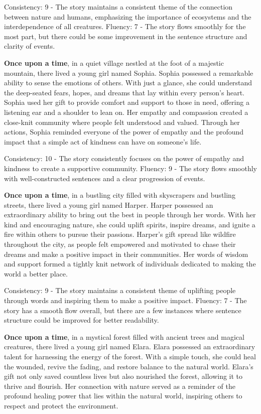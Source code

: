 \documentclass{article}
\begin{document}
Consistency: 9 - The story maintains a consistent theme of the connection between nature and humans, emphasizing the importance of ecosystems and the interdependence of all creatures.
Fluency: 7 - The story flows smoothly for the most part, but there could be some improvement in the sentence structure and clarity of events.

\textbf{Once upon a time}, in a quiet village nestled at the foot of a majestic mountain, there lived a young girl named Sophia. Sophia possessed a remarkable ability to sense the emotions of others. With just a glance, she could understand the deep-seated fears, hopes, and dreams that lay within every person's heart. Sophia used her gift to provide comfort and support to those in need, offering a listening ear and a shoulder to lean on. Her empathy and compassion created a close-knit community where people felt understood and valued. Through her actions, Sophia reminded everyone of the power of empathy and the profound impact that a simple act of kindness can have on someone's life.

Consistency: 10 - The story consistently focuses on the power of empathy and kindness to create a supportive community.
Fluency: 9 - The story flows smoothly with well-constructed sentences and a clear progression of events.

\textbf{Once upon a time}, in a bustling city filled with skyscrapers and bustling streets, there lived a young girl named Harper. Harper possessed an extraordinary ability to bring out the best in people through her words. With her kind and encouraging nature, she could uplift spirits, inspire dreams, and ignite a fire within others to pursue their passions. Harper's gift spread like wildfire throughout the city, as people felt empowered and motivated to chase their dreams and make a positive impact in their communities. Her words of wisdom and support formed a tightly knit network of individuals dedicated to making the world a better place.

Consistency: 9 - The story maintains a consistent theme of uplifting people through words and inspiring them to make a positive impact.
Fluency: 7 - The story has a smooth flow overall, but there are a few instances where sentence structure could be improved for better readability.

\textbf{Once upon a time}, in a mystical forest filled with ancient trees and magical creatures, there lived a young girl named Elara. Elara possessed an extraordinary talent for harnessing the energy of the forest. With a simple touch, she could heal the wounded, revive the fading, and restore balance to the natural world. Elara's gift not only saved countless lives but also nourished the forest, allowing it to thrive and flourish. Her connection with nature served as a reminder of the profound healing power that lies within the natural world, inspiring others to respect and protect the environment.
\end{document}

